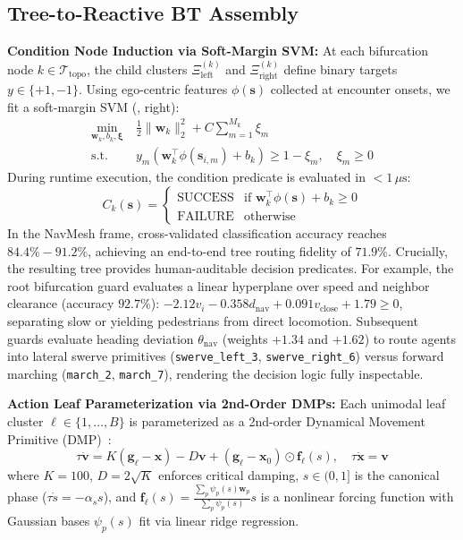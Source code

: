\documentclass{sice-si}
\begin{document}
\subsection{\texorpdfstring{Tree-to-Reactive BT}{Tree to Reactive BT} Assembly}
\textbf{Condition Node Induction via Soft-Margin SVM:}
At each bifurcation node $k \in \mathcal{T}_{\text{topo}}$, the child clusters $\Xi_{\text{left}}^{(k)}$ and $\Xi_{\text{right}}^{(k)}$ define binary targets $y \in \{+1, -1\}$. Using ego-centric features $\phi(\mathbf{s})$ collected at encounter onsets, we fit a soft-margin SVM (, right):
\begin{align}
    \min_{\mathbf{w}_k, b_k, \boldsymbol{\xi}} \ & \frac{1}{2} \|\mathbf{w}_k\|_2^2 + C \sum_{m=1}^{M_k} \xi_m \\
    \text{s.t.} \ & y_m (\mathbf{w}_k^\top \phi(\mathbf{s}_{i, m}) + b_k) \ge 1 - \xi_m, \quad \xi_m \ge 0 \nonumber
\end{align}
During runtime execution, the condition predicate is evaluated in $< 1\,\mu\text{s}$:
\begin{equation}
    C_k(\mathbf{s}) = \begin{cases} \text{SUCCESS} & \text{if } \mathbf{w}_k^\top \phi(\mathbf{s}) + b_k \ge 0 \\ \text{FAILURE} & \text{otherwise} \end{cases}
\end{equation}
In the NavMesh frame, cross-validated classification accuracy reaches $84.4\% - 91.2\%$, achieving an end-to-end tree routing fidelity of $71.9\%$. Crucially, the resulting tree provides human-auditable decision predicates. For example, the root bifurcation guard evaluates a linear hyperplane over speed and neighbor clearance (accuracy $92.7\%$): $-2.12 v_i - 0.358 d_{\text{nav}} + 0.091 v_{\text{close}} + 1.79 \ge 0$, separating slow or yielding pedestrians from direct locomotion. Subsequent guards evaluate heading deviation $\theta_{\text{nav}}$ (weights $+1.34$ and $+1.62$) to route agents into lateral swerve primitives (\texttt{swerve\_left\_3}, \texttt{swerve\_right\_6}) versus forward marching (\texttt{march\_2}, \texttt{march\_7}), rendering the decision logic fully inspectable.

\textbf{Action Leaf Parameterization via 2nd-Order DMPs:}
Each unimodal leaf cluster $\ell \in \{1, \dots, B\}$ is parameterized as a 2nd-order Dynamical Movement Primitive (DMP)~\cite{ijspeert2013dynamical}:
\begin{equation}
    \tau \dot{\mathbf{v}} = K (\mathbf{g}_\ell - \mathbf{x}) - D \mathbf{v} + (\mathbf{g}_\ell - \mathbf{x}_0) \odot \mathbf{f}_\ell(s), \quad \tau \dot{\mathbf{x}} = \mathbf{v}
\end{equation}
where $K=100$, $D=2\sqrt{K}$ enforces critical damping, $s \in (0, 1]$ is the canonical phase ($\tau \dot{s} = -\alpha_s s$), and $\mathbf{f}_\ell(s) = \frac{\sum_{p} \psi_p(s) \mathbf{w}_p}{\sum_{p} \psi_p(s)} s$ is a nonlinear forcing function with Gaussian bases $\psi_p(s)$ fit via linear ridge regression.
\end{document}
